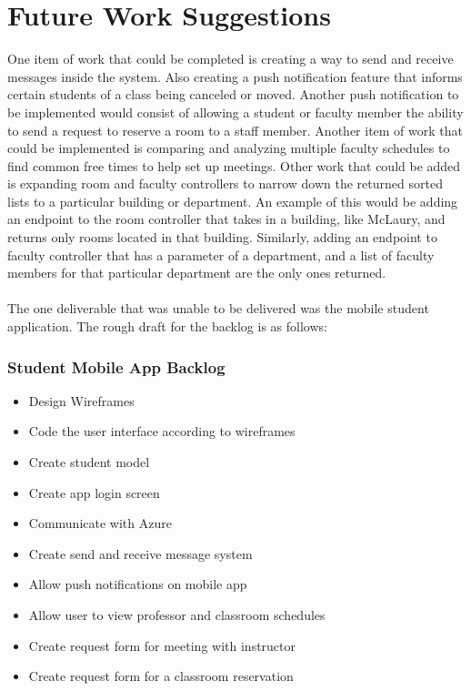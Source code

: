 \documentclass{book}
\begin{document}

\appendix
\chapter{Future Work Suggestions}
\label{FutureAppendix}
One item of work that could be completed is creating a way to send and receive messages inside the system. Also creating a push notification feature that informs certain students of a class being canceled or moved. Another push notification to be implemented would consist of allowing a student or faculty member the ability to send a request to reserve a room to a staff member. Another item of work that could be implemented is comparing and analyzing multiple faculty schedules to find common free times to help set up meetings.  Other work that could be added is expanding room and faculty controllers to narrow down the returned sorted lists to a particular building or department. An example of this would be adding an endpoint to the room controller that takes in a building, like McLaury, and returns only rooms located in that building. Similarly, adding an endpoint to faculty controller that has a parameter of a department, and a list of faculty members for that particular department are the only ones returned. \\\\
The one deliverable that was unable to be delivered was the mobile student application. The rough draft for the backlog is as follows:
\subsection*{Student Mobile App Backlog}
\begin{itemize}
	\item Design Wireframes
	\item Code the user interface according to wireframes
	\item Create student model
	\item Create app login screen
	\item Communicate with Azure
	\item Create send and receive message system
	\item Allow push notifications on mobile app
	\item Allow user to view professor and classroom schedules
	\item Create request form for meeting with instructor
	\item Create request form for a classroom reservation 
\end{itemize}
\end{document}
